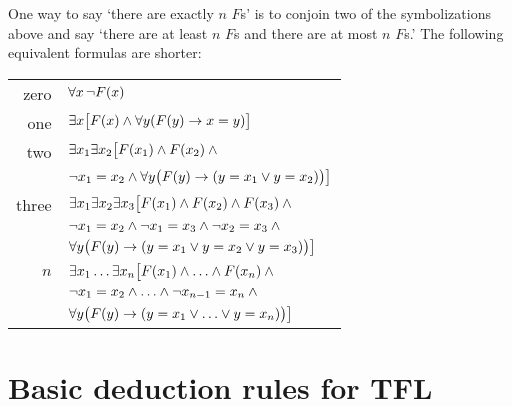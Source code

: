 One way to say `there are exactly $n$ $F$s' is to conjoin two of the symbolizations above and say `there are at least $n$ $F$s and there are at most $n$ $F$s.' The following equivalent formulas are shorter:
\begin{tabular*}{\textwidth}{rl}
zero & $\forall x\,\neg \mathord{F}(x)$\\
one & $\exists x\bigl[\mathord{F}(x) \wedge \forall y(\mathord{F}(y) \rightarrow x = y)\bigr]$\\
two & $\exists x_1\exists x_2\bigl[\mathord{F}(x_1) \wedge \mathord{F}(x_2) \wedge {}$\\
& $\neg x_1 = x_2 \wedge \forall y\bigl(\mathord{F}(y) \rightarrow (y= x_1 \vee y = x_2)\bigr) \bigr]$\\
three & $\exists x_1\exists x_2\exists x_3\bigl[\mathord{F}(x_1) \wedge \mathord{F}(x_2) \wedge \mathord{F}(x_3) \wedge {}$\\
& $\neg x_1 =  x_2 \wedge \neg  x_1 = x_3 \wedge \neg x_2 = x_3 \wedge {}$\\
& $\forall y\bigl(\mathord{F}(y) \rightarrow (y = x_1 \vee y = x_2 \vee y =  x_3)\bigr) \bigr]$\\
$n$ & $\exists x_1\ldots\exists x_n\bigl[\mathord{F}(x_1) \wedge\ldots\wedge \mathord{F}(x_n)  \wedge {}$\\
&$ \neg x_1 = x_2 \wedge\ldots\wedge \neg x_{n-1}= x_n \wedge \phantom{.}$\\
& $\forall y\bigl(\mathord{F}(y) \rightarrow (y= x_1 \vee \ldots \vee y= x_n)\bigr)\bigr]$ 
\end{tabular*}


\label{ProofRules}
\newpage\section{Basic deduction rules for TFL}

